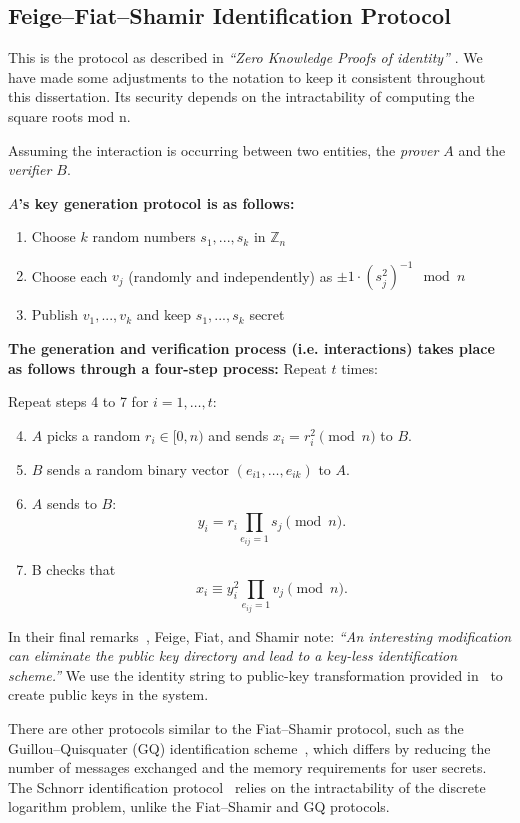 \subsection{Feige--Fiat--Shamir Identification Protocol}

This is the protocol as described in \textit{``Zero Knowledge Proofs of identity''} \cite{feige_zero-knowledge_1988}. We have made some adjustments to the notation to keep it consistent throughout this dissertation. Its security depends on the intractability of computing the square roots mod n.

Assuming the interaction is occurring between two entities, the \textit{prover $A$} and the \textit{verifier $B$}.

\textbf{$A$'s key generation protocol is as follows:}

\begin{enumerate}
    \item Choose $k$ random numbers $s_1,...,s_k$ in $\mathbb{Z}_n$
    \item Choose each $v_j$ (randomly and independently) as $\pm1 \cdot (s_j^2)^{-1} \mod{n}$
    \item Publish $v_1,...,v_k$ and keep $s_1,...,s_k$ secret
\end{enumerate}

\textbf{The generation and verification process (i.e. interactions) takes place as follows through a four-step process:}
Repeat \(t\) times:

Repeat steps 4 to 7 for \(i = 1, \ldots, t\):

\begin{enumerate}
    \setcounter{enumi}{3}
    \item $A$ picks a random \(r_i \in [0, n)\) and sends \(x_i = r_i^2 \pmod{n}\) to $B$.
    \item $B$ sends a random binary vector \((e_{i1}, \ldots, e_{ik})\) to $A$.
    \item $A$ sends to $B$:
    \[
    y_i = r_i \prod_{e_{ij}=1} s_j \pmod{n}.
    \]
    \item B checks that
    \[
    x_i \equiv y_i^2 \prod_{e_{ij}=1} v_j \pmod{n}.
    \]
\end{enumerate}


In their final remarks~\cite{feige_zero-knowledge_1988}, Feige, Fiat, and Shamir note: \emph{``An interesting modification can eliminate the public key directory and lead to a key-less identification scheme.''} We use the identity string to public-key transformation provided in~\cite{feige_zero-knowledge_1988} to create public keys in the system.

There are other protocols similar to the Fiat--Shamir protocol, such as the Guillou--Quisquater (GQ) identification scheme~\cite{guillou_practical_1988}, which differs by reducing the number of messages exchanged and the memory requirements for user secrets. The Schnorr identification protocol~\cite{schnorr_efficient_1990} relies on the intractability of the discrete logarithm problem, unlike the Fiat--Shamir and GQ protocols.